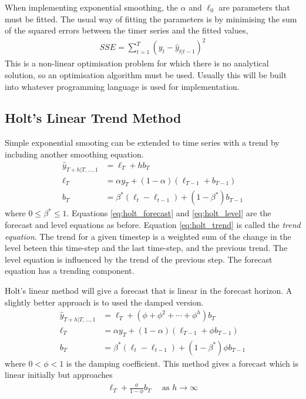 \documentclass[a4paper,12pt]{article}
\theoremstyle{definition}
\begin{document}
When implementing exponential smoothing, the $\alpha$ and $\ell_0$ are parameters that must be fitted. The usual way of fitting the parameters is by minimising the sum of the squared errors between the timer series and the fitted values,
\begin{align}
	SSE =  \sum_{t=1}^T\left( y_t - \hat{y}_{t|t-1} \right)^2
\end{align}
This is a non-linear optimisation problem for which there is no analytical solution, so an optimisation algorithm must be used. Usually this will be built into whatever programming language is used for implementation.

\subsection{Holt's Linear Trend Method}
Simple exponential smooting can be extended to time series with a trend by including another smoothing equation.
\begin{align}
	\hat{y}_{T+h|T,\dots,1} &= \ell_T + hb_T \label{eq:holt_forecast}\\
	\ell_T &= \alpha y_T + (1 - \alpha)\left(\ell_{T-1} + b_{T-1}\right) \label{eq:holt_level} \\
	b_T &= \beta^*\left( \ell_t - \ell_{t-1} \right) + (1 - \beta^*)b_{T-1} \label{eq:holt_trend}
\end{align}
where $0 \leq \beta^* \leq 1$. Equations \ref{eq:holt_forecast} and \ref{eq:holt_level} are the forecast and level equations as before. Equation \ref{eq:holt_trend} is called the \textit{trend equation}. The trend for a given timestep is a weighted sum of the change in the level beteen this time-step and the last time-step, and the previous trend. The level equation is influenced by the trend of the previous step. The forecast equation has a trending component.

Holt's linear method will give a forecast that is linear in the forecast horizon. A slightly better approach is to used the damped version.
\begin{align}
	\hat{y}_{T+h|T,\dots,1} &= \ell_T + \left( \phi + \phi^2 + \cdots + \phi^h \right)b_T \label{eq:holt_forecast}\\
	\ell_T &= \alpha y_T	+ (1 - \alpha)\left(\ell_{T-1} + \phi b_{T-1}\right) \label{eq:holt_level} \\
	b_T &= \beta^*\left( \ell_t - \ell_{t-1} \right) + (1 - \beta^*)\phi b_{T-1} \label{eq:holt_trend}
\end{align}
where $0 < \phi < 1$ is the damping coefficient. This method gives a forecast which is linear initially but approaches 
\begin{align}
	\ell_T + \frac{\phi}{1-\phi} b_T \quad \text{ as } h \rightarrow \infty
\end{align}
\end{document}
